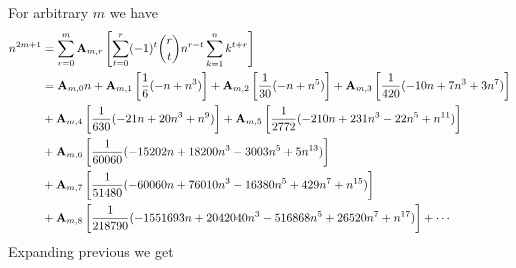 For arbitrary $m$ we have
\begin{equation}
    \begin{split}
        n^{2m+1}
        &= \sum_{r=0}^{m} {\mathbf{A}} \sb{m,r} \left[ \sum_{t=0}^{r} (-1)^t \binom{r}{t} n^{r-t} \sum_{k=1}^{n} k^{t+r} \right] \\
        &= {\mathbf{A}} \sb{m,0} n
        + {\mathbf{A}} \sb{m,1} \left[ \frac{1}{6} (-n + n^3) \right]
        + {\mathbf{A}} \sb{m,2} \left[ \frac{1}{30} (-n + n^5) \right]
        + {\mathbf{A}} \sb{m,3} \left[ \frac{1}{420} (-10 n + 7 n^3 + 3 n^7) \right] \\
        &+ {\mathbf{A}} \sb{m,4} \left[ \frac{1}{630} (-21 n + 20 n^3 + n^9) \right]
        + {\mathbf{A}} \sb{m,5} \left[ \frac{1}{2772} (-210 n + 231 n^3 - 22 n^5 + n^{11}) \right] \\
        &+ {\mathbf{A}} \sb{m,6} \left[ \frac{1}{60060} (-15202 n + 18200 n^3 - 3003 n^5 + 5 n^{13}) \right] \\
        &+ {\mathbf{A}} \sb{m,7} \left[ \frac{1}{51480} (-60060 n + 76010 n^3 - 16380 n^5 + 429 n^7 + n^{15}) \right] \\
        &+ {\mathbf{A}} \sb{m,8} \left[ \frac{1}{218790} (-1551693 n + 2042040 n^3 - 516868 n^5 + 26520 n^7 + n^{17}) \right] + \cdots
    \end{split}\label{eq:equation17}
\end{equation}
Expanding previous we get

